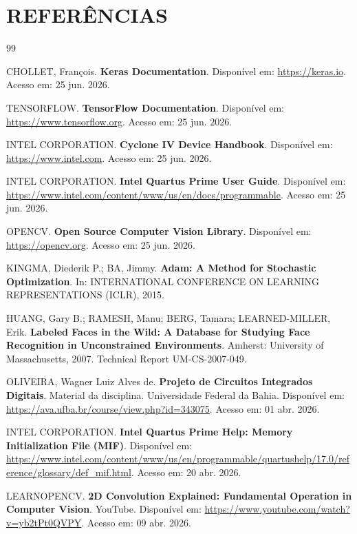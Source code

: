 \chapter*{REFERÊNCIAS}

\begin{thebibliography}{99}

CHOLLET, François.
\textbf{Keras Documentation}.
Disponível em:
\url{https://keras.io}.
Acesso em: 25 jun. 2026.

TENSORFLOW.
\textbf{TensorFlow Documentation}.
Disponível em:
\url{https://www.tensorflow.org}.
Acesso em: 25 jun. 2026.

INTEL CORPORATION.
\textbf{Cyclone IV Device Handbook}.
Disponível em:
\url{https://www.intel.com}.
Acesso em: 25 jun. 2026.

INTEL CORPORATION.
\textbf{Intel Quartus Prime User Guide}.
Disponível em:
\url{https://www.intel.com/content/www/us/en/docs/programmable}.
Acesso em: 25 jun. 2026.

OPENCV.
\textbf{Open Source Computer Vision Library}.
Disponível em:
\url{https://opencv.org}.
Acesso em: 25 jun. 2026.

KINGMA, Diederik P.; BA, Jimmy.
\textbf{Adam: A Method for Stochastic Optimization}.
In: INTERNATIONAL CONFERENCE ON LEARNING REPRESENTATIONS (ICLR), 2015.

HUANG, Gary B.; RAMESH, Manu; BERG, Tamara;
LEARNED-MILLER, Erik.
\textbf{Labeled Faces in the Wild: A Database for Studying Face Recognition in Unconstrained Environments}.
Amherst: University of Massachusetts, 2007.
Technical Report UM-CS-2007-049.

OLIVEIRA, Wagner Luiz Alves de.
\textbf{Projeto de Circuitos Integrados Digitais}.
Material da disciplina.
Universidade Federal da Bahia.
Disponível em:
\url{https://ava.ufba.br/course/view.php?id=343075}.
Acesso em: 01 abr. 2026.

INTEL CORPORATION.
\textbf{Intel Quartus Prime Help: Memory Initialization File (MIF)}.
Disponível em:
\url{https://www.intel.com/content/www/us/en/programmable/quartushelp/17.0/reference/glossary/def_mif.html}.
Acesso em: 20 abr. 2026.

LEARNOPENCV.
\textbf{2D Convolution Explained: Fundamental Operation in Computer Vision}.
YouTube.
Disponível em:
\url{https://www.youtube.com/watch?v=yb2tPt0QVPY}.
Acesso em: 09 abr. 2026.


\end{thebibliography}
